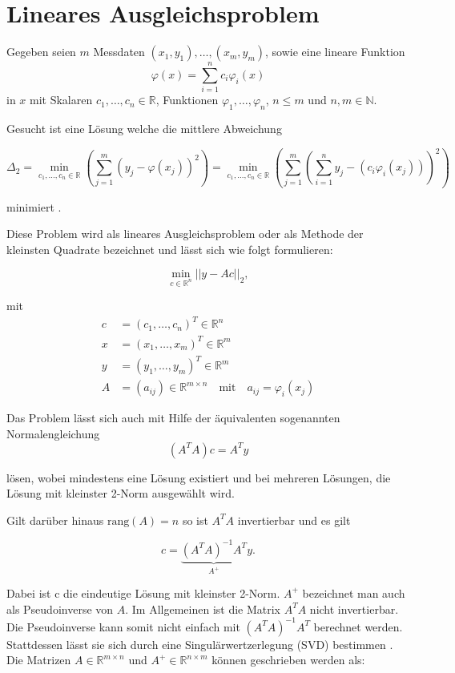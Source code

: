 \section{Lineares Ausgleichsproblem}
\label{s:LSQ}
Gegeben seien $m$ Messdaten $(x_1,y_1),\dotsc,(x_m,y_m)$, sowie eine lineare Funktion 
\[
\varphi(x) = \sum_{i = 1}^{n}c_i\varphi_i(x)
\] %
in $x$ mit Skalaren $c_1,\dotsc,c_n\in\mathbb{R}$, Funktionen $\varphi_1,\dotsc,\varphi_n$, $n\leq m$ und $n,m\in\mathbb{N}$. 

Gesucht ist eine Lösung welche die mittlere Abweichung

\[
\Delta_2 = \min_{c_1,\dotsc,c_n\in\mathbb{R}} \left(\sum_{j=1}^{m}\left(y_j - \varphi(x_j)\right)^2\right) = \min_{c_1,\dotsc,c_n\in\mathbb{R}} \left(\sum_{j=1}^{m}\left(\sum_{i=1}^{n}y_j-\left(c_i\varphi_i(x_j)\right)\right)^2\right)
\]

minimiert \cite{Stoer2007}.

Diese Problem wird als lineares Ausgleichsproblem oder als Methode der kleinsten Quadrate bezeichnet und lässt sich wie folgt formulieren:

\[
\min_{c\in\mathbb{R}^n} ||y - Ac||_2,
\]

mit 
\[
\begin{aligned}
c &= (c_1,\dotsc,c_n)^T\in\mathbb{R}^n \\
x &= (x_1,\dotsc,x_m)^T\in\mathbb{R}^m \\
y &= (y_1,\dotsc,y_m)^T\in\mathbb{R}^m \\
A &= (a_{ij})\in\mathbb{R}^{m\times n}\quad\text{mit}\quad a_{ij} = \varphi_i(x_j)
\end{aligned}
\]

Das Problem lässt sich auch mit Hilfe der äquivalenten sogenannten Normalengleichung
\begin{equation*}
	(A^TA)c = A^Ty
\end{equation*}

lösen, wobei mindestens eine Lösung existiert und bei mehreren Lösungen, die Lösung mit kleinster 2-Norm ausgewählt wird. 

Gilt darüber hinaus $\text{rang}\left(A\right) = n$ so ist $A^TA$ invertierbar und es gilt 

\begin{equation}\label{eq:normaleq}
c = \underbrace{(A^TA)^{-1}A^T}_{A^+}y.
\end{equation}

Dabei ist c die eindeutige Lösung mit kleinster 2-Norm. $A^+$ bezeichnet man auch als Pseudoinverse von $A$. Im Allgemeinen ist die Matrix $A^TA$ nicht invertierbar. Die Pseudoinverse kann somit nicht einfach mit $(A^TA)^{-1}A^T$ berechnet werden. Stattdessen lässt sie sich durch eine Singulärwertzerlegung (SVD) bestimmen \cite{Stoer2011}. Die Matrizen $A\in\mathbb{R}^{m\times n}$ und $A^+\in\mathbb{R}^{n\times m}$ können geschrieben werden als:

